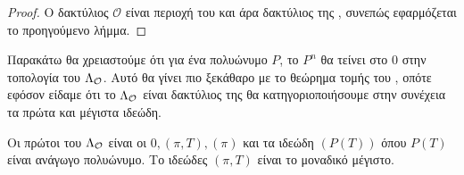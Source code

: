 \begin{proof}
Ο δακτύλιος $\mathcal{O}$ είναι περιοχή του  και άρα δακτύλιος της , συνεπώς εφαρμόζεται το προηγούμενο λήμμα.
\end{proof}

\noindent Παρακάτω θα χρειαστούμε ότι για ένα  πολυώνυμο $P$, το $P^n$ θα τείνει στο $0$ στην τοπολογία του $\Lambda_\mathcal{O}$. Αυτό θα γίνει πιο ξεκάθαρο με το θεώρημα τομής του , οπότε εφόσον είδαμε ότι το $\Lambda_\mathcal{O}$ είναι δακτύλιος της  θα κατηγοριοποιήσουμε στην συνέχεια τα πρώτα και μέγιστα ιδεώδη.

\begin{prop}
Οι πρώτοι του $\Lambda_\mathcal{O}$ είναι οι $0,(\pi,T),(\pi)$ και τα ιδεώδη $(P(T))$ όπου $P(T)$ είναι ανάγωγο  πολυώνυμο. Το ιδεώδες $(\pi,T)$ είναι το μοναδικό μέγιστο.
\end{prop}

